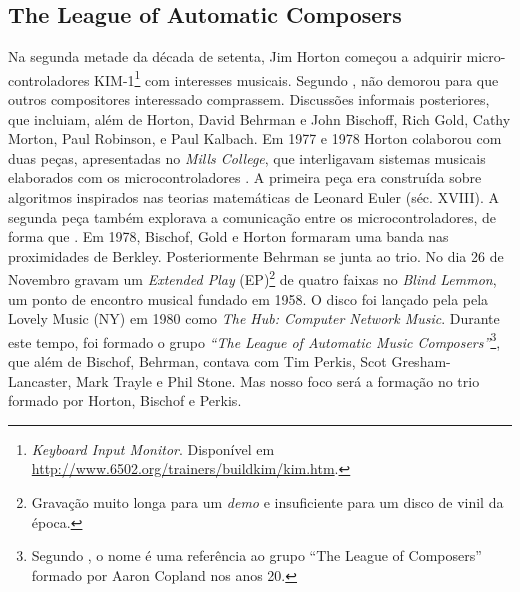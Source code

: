 \subsection{The League of Automatic Composers}

Na segunda metade da década de setenta, Jim Horton começou a adquirir micro-controladores KIM-1\footnote{\emph{Keyboard Input Monitor}. Disponível em \url{http://www.6502.org/trainers/buildkim/kim.htm}.} com interesses musicais. Segundo , não demorou para que outros compositores interessado comprassem. Discussões informais posteriores, que incluiam, além de Horton, David Behrman e John Bischoff, Rich Gold, Cathy Morton, Paul Robinson, e Paul Kalbach. Em 1977 e 1978  Horton colaborou com duas peças, apresentadas no \emph{Mills College}, que interligavam sistemas musicais elaborados com os microcontroladores . A primeira peça era construída sobre algoritmos inspirados nas teorias matemáticas de Leonard Euler (séc. XVIII). A segunda peça também explorava a comunicação entre os microcontroladores, de forma que . Em 1978, Bischof, Gold e Horton formaram uma banda nas proximidades de Berkley. Posteriormente Behrman se junta ao trio. No dia 26 de Novembro gravam um \emph{Extended Play} (EP)\footnote{Gravação muito longa para um \emph{demo} e insuficiente para um disco de vinil da época.} de quatro faixas no \emph{Blind Lemmon}, um ponto de encontro musical fundado em 1958. O disco foi lançado pela pela Lovely Music (NY) em 1980 como \emph{The Hub: Computer Network Music}.  Durante este tempo, foi formado o grupo \emph{``The League of Automatic Music Composers''}\footnote{Segundo , o nome é uma referência ao grupo ``The League of Composers'' formado por Aaron Copland nos anos 20.}, que além de  Bischof, Behrman, contava com Tim Perkis, Scot Gresham-Lancaster, Mark Trayle e Phil Stone. Mas nosso foco será a formação no trio formado por Horton, Bischof e Perkis.

